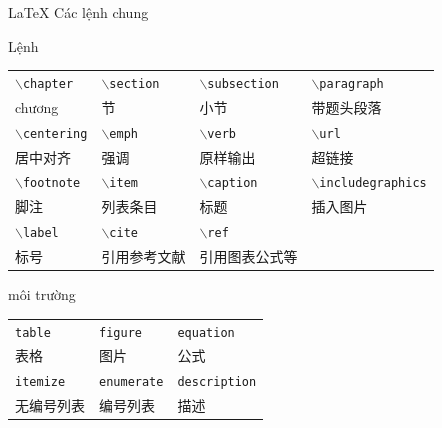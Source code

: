 \documentclass{beamer}
\def\cmd#1{\texttt{\color{red}\footnotesize $\backslash$#1}}
\def\env#1{\texttt{\color{blue}\footnotesize #1}}
\begin{document}
\begin{frame}[fragile]{\LaTeX{} Các lệnh chung}  %
    \begin{exampleblock}{Lệnh}  %
        \centering
        \footnotesize
        \begin{tabular}{llll}
            \cmd{chapter} & \cmd{section} & \cmd{subsection} & \cmd{paragraph} \\
            chương & 节 & 小节 & 带题头段落 \\\hline
            \cmd{centering} & \cmd{emph} & \cmd{verb} & \cmd{url} \\
            居中对齐 & 强调 & 原样输出 & 超链接 \\\hline
            \cmd{footnote} & \cmd{item} & \cmd{caption} & \cmd{includegraphics} \\
            脚注 & 列表条目 & 标题 & 插入图片 \\\hline
            \cmd{label} & \cmd{cite} & \cmd{ref} \\
            标号 & 引用参考文献 & 引用图表公式等\\\hline
        \end{tabular}
    \end{exampleblock}
    \begin{exampleblock}{môi trường} %
        \centering
        \footnotesize
        \begin{tabular}{lll}
            \env{table} & \env{figure} & \env{equation}\\
            表格 & 图片 & 公式 \\\hline
            \env{itemize} & \env{enumerate} & \env{description}\\
            无编号列表 & 编号列表 & 描述 \\\hline
        \end{tabular}
    \end{exampleblock}
\end{frame}
\end{document}
